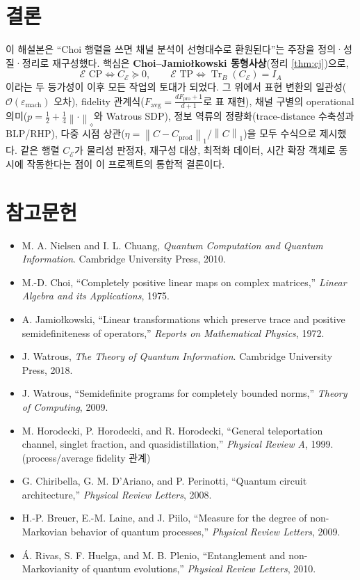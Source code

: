 \documentclass[11pt,a4paper]{article}
\newcommand{\E}{\mathcal{E}}
\newcommand{\Tr}{\operatorname{Tr}}
\newcommand{\diamondnorm}[1]{\left\lVert #1 \right\rVert_{\diamond}}
\newcommand{\onenorm}[1]{\left\lVert #1 \right\rVert_{1}}
\theoremstyle{definition}
\theoremstyle{plain}
\theoremstyle{remark}
\begin{document}
\section{결론}

이 해설본은 ``Choi 행렬을 쓰면 채널 분석이 선형대수로 환원된다''는 주장을 정의·성질·정리로 재구성했다. 핵심은 \textbf{Choi--Jamio{\l}kowski 동형사상}(정리 \ref{thm:cj})으로,
\[
\E\text{ CP}\iff C_\E\succeq0,\qquad \E\text{ TP}\iff\Tr_B(C_\E)=I_A
\]
이라는 두 등가성이 이후 모든 작업의 토대가 되었다. 그 위에서 표현 변환의 일관성($\mathcal O(\varepsilon_{\mathrm{mach}})$ 오차), fidelity 관계식($F_{\mathrm{avg}}=\frac{dF_{\mathrm{pro}}+1}{d+1}$로 표 재현), 채널 구별의 operational 의미($p=\tfrac12+\tfrac14\diamondnorm{\cdot}$와 Watrous SDP), 정보 역류의 정량화(trace-distance 수축성과 BLP/RHP), 다중 시점 상관($\eta=\onenorm{C-C_{\mathrm{prod}}}/\onenorm{C}$)을 모두 수식으로 제시했다. 같은 행렬 $C_\E$가 물리성 판정자, 재구성 대상, 최적화 데이터, 시간 확장 객체로 동시에 작동한다는 점이 이 프로젝트의 통합적 결론이다.

\section*{참고문헌}
\begin{itemize}
  \item M. A. Nielsen and I. L. Chuang, \textit{Quantum Computation and Quantum Information}. Cambridge University Press, 2010.
  \item M.-D. Choi, ``Completely positive linear maps on complex matrices,'' \textit{Linear Algebra and its Applications}, 1975.
  \item A. Jamio{\l}kowski, ``Linear transformations which preserve trace and positive semidefiniteness of operators,'' \textit{Reports on Mathematical Physics}, 1972.
  \item J. Watrous, \textit{The Theory of Quantum Information}. Cambridge University Press, 2018.
  \item J. Watrous, ``Semidefinite programs for completely bounded norms,'' \textit{Theory of Computing}, 2009.
  \item M. Horodecki, P. Horodecki, and R. Horodecki, ``General teleportation channel, singlet fraction, and quasidistillation,'' \textit{Physical Review A}, 1999. (process/average fidelity 관계)
  \item G. Chiribella, G. M. D'Ariano, and P. Perinotti, ``Quantum circuit architecture,'' \textit{Physical Review Letters}, 2008.
  \item H.-P. Breuer, E.-M. Laine, and J. Piilo, ``Measure for the degree of non-Markovian behavior of quantum processes,'' \textit{Physical Review Letters}, 2009.
  \item Á. Rivas, S. F. Huelga, and M. B. Plenio, ``Entanglement and non-Markovianity of quantum evolutions,'' \textit{Physical Review Letters}, 2010.
\end{itemize}
\end{document}
